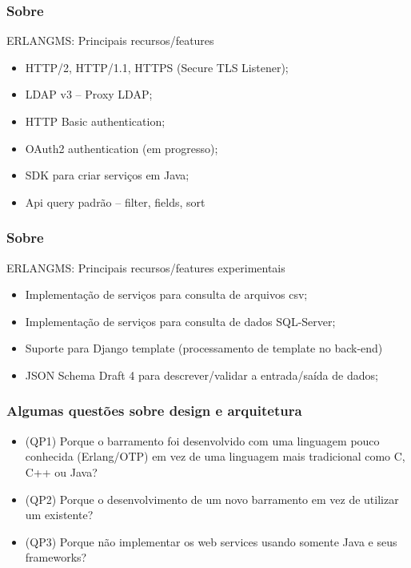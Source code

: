 \documentclass{beamer}
\begin{document}
\begin{frame}
  \frametitle{Sobre}

  \begin{exampleblock}{ERLANGMS: Principais recursos/features}
  
	  \begin{itemize}
		\item<1->HTTP/2, HTTP/1.1, HTTPS (Secure TLS Listener);
	    \item<1->LDAP v3 -- Proxy LDAP;
	    \item<1->HTTP Basic authentication;
    	    \item<1->OAuth2 authentication (em progresso);
		\item<1->SDK para criar serviços em Java;
		\item<1->Api query padrão -- filter, fields, sort
	  \end{itemize}

  \end{exampleblock}

  
\end{frame}


\begin{frame}
  \frametitle{Sobre}

  \begin{exampleblock}{ERLANGMS: Principais recursos/features experimentais}
  
	  \begin{itemize}
		\item<1->Implementação de serviços para consulta de arquivos csv;
 	    \item<1->Implementação de serviços para consulta de dados SQL-Server;
	    \item<1->Suporte para Django template (processamento de template no back-end)
    	    \item<1->JSON Schema Draft 4 para descrever/validar a entrada/saída de dados;
	  \end{itemize}

  \end{exampleblock}

  
\end{frame}


\begin{frame}
  \frametitle{Algumas questões sobre design e arquitetura}

  \begin{exampleblock}{}
  
	  \begin{itemize}
		\item<1->(QP1) Porque o barramento foi desenvolvido com 
		uma linguagem pouco conhecida (Erlang/OTP) em vez de uma linguagem mais tradicional como C, C++ ou Java?
	    \item<1->(QP2) Porque o desenvolvimento de um novo barramento em vez de utilizar um existente?
	    \item<1->(QP3) Porque não implementar os web services usando somente Java e seus frameworks?
	  \end{itemize}
  
  \end{exampleblock}

  
\end{frame}
\end{document}
